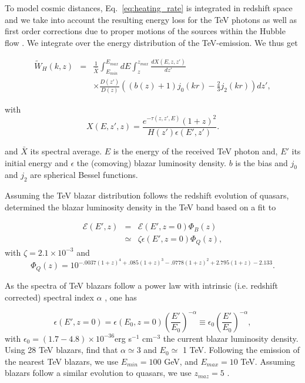 \documentclass[twocolumns]{emulateapj}
\begin{document}
 To model cosmic distances, Eq.~\ref{eq:heating_rate} is integrated in redshift space and we take into account the resulting energy loss for the TeV photons as well as first order corrections due to proper motions of the sources within the Hubble flow \citep{1987MNRAS.227....1K}. We integrate over the energy distribution of the TeV-emission. We thus get

\begin{eqnarray}
  \label{eq:window}
  \tilde{W}_H(k,z)&=&\frac{1}{\bar{X}}\int_{E_{min}}^{E_{max}}dE\int_z^{z_{max}}\frac{dX(E,z,z')}{dz'} \\ 
&&\times \frac{D(z')}{D(z)}\left((b(z)+1)j_0(kr)-\frac{2}{3}j_2(kr)\right)dz', \nonumber
\end{eqnarray}

with 
 \begin{equation}
  \label{eq:define_X}
  X(E,z',z)=\frac{e^{-\tau(z,z',E)}(1+z)^2}{H(z')\epsilon(E',z')}.
\end{equation}

and $\bar{X}$ its spectral average. $E$ is the energy of the received TeV photon and, $E'$ its initial energy and  $\epsilon$ the (comoving) blazar luminosity density. $b$ is the bias and $j_0$ and $j_2$ are spherical Bessel functions.


Assuming the TeV blazar distribution follows the redshift evolution of quasars, \citet{2012ApJ...752...22B} determined the blazar luminosity density in the TeV band based on a fit to \citet{2007ApJ...654..731H}

\begin{eqnarray}
  \label{eq:mean_heat}
  \mathcal{E}(E',z)&=&\mathcal{E}(E',z=0)\Phi_{B}(z)\\ \nonumber
&\simeq& \zeta\epsilon(E',z=0)\Phi_{Q}(z),
\end{eqnarray}
with $\zeta=2.1\times 10^{-3}$ and
\begin{equation}
  \label{eq:phi_quasar}
 \Phi_{Q}(z)=10^{-.0037(1+z)^4+.085(1+z)^3-.0778(1+z)^2+2.795(1+z)-2.133}. 
\end{equation}
 

As the spectra of TeV blazars follow a power law with intrinsic (i.e. redshift corrected) spectral index $\alpha$ , one has

\begin{equation}
  \label{eq:blaz_lum}
  \epsilon(E',z=0)=\epsilon(E_0,z=0)\left(\frac{E'}{E_0}\right)^{-\alpha}\equiv \epsilon_0\left(\frac{E'}{E_0}\right)^{-\alpha},
\end{equation}
with $\epsilon_0=(1.7-4.8)\times 10^{-36}$erg s$^{-1}$ cm$^{-3}$ the current blazar luminosity density. Using 28 TeV blazars, \citet{2012ApJ...752...23C} find that $\alpha\simeq 3$ and $E_0\simeq $ 1 TeV. Following the emission of the nearest TeV blazars, we use $E_{min}=100$ GeV,  and $E_{max}=10$ TeV. Assuming blazars follow a similar evolution to quasars, we use $z_{maz}=5$  \citep{2007ApJ...654..731H}.
\end{document}
